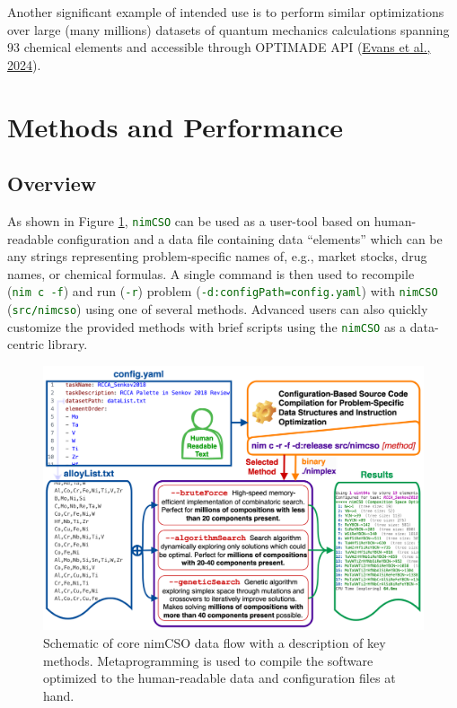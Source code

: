 \documentclass[
]{article}
\let\oldtexttt\texttt
\renewcommand{\texttt}[1]{\oldtexttt{\textcolor{darkgreen}{#1}}}
\begin{document}
Another significant example of intended use is to perform similar
optimizations over large (many millions) datasets of quantum mechanics
calculations spanning 93 chemical elements and accessible through
OPTIMADE API (\protect\hyperlink{ref-Evans2024}{Evans et al., 2024}).

\hypertarget{methods-and-performance}{%
\section{Methods and Performance}\label{methods-and-performance}}

\hypertarget{overview}{%
\subsection{Overview}\label{overview}}

As shown in Figure \ref{fig:main}, \texttt{nimCSO} can be used as a
user-tool based on human-readable configuration and a data file
containing data ``elements'' which can be any strings representing
problem-specific names of, e.g., market stocks, drug names, or chemical
formulas. A single command is then used to recompile
(\texttt{nim\ c\ -f}) and run (\texttt{-r}) problem
(\texttt{-d:configPath=config.yaml}) with \texttt{nimCSO}
(\texttt{src/nimcso}) using one of several methods. Advanced users can
also quickly customize the provided methods with brief scripts using the
\texttt{nimCSO} as a data-centric library.

\begin{figure}[h]
\centering
\includegraphics[width=4.75in,height=\textheight]{assets/nimCSO_mainFigure.png}
\caption{Schematic of core nimCSO data flow with a description of key
methods. Metaprogramming is used to compile the software optimized to
the human-readable data and configuration files at
hand.}
\label{fig:main}
\end{figure}
\end{document}
